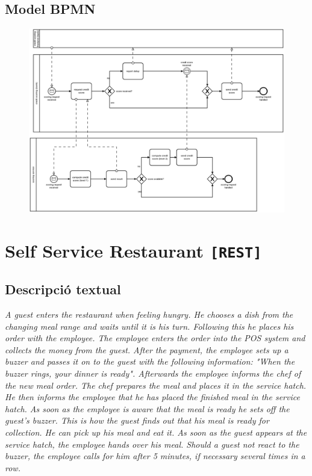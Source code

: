 \subsection*{Model BPMN}

\begin{figure}[!h]
    \centering
    \includegraphics[width=\textwidth]{figures/benchmark/Credit-scoring.png}
\end{figure}

\clearpage

\section{Self Service Restaurant \texttt{[REST]}}

\subsection*{Descripció textual}

\textit{A guest enters the restaurant when feeling hungry. He chooses a dish from the changing meal range and waits until it is his turn. Following this he places his order with the employee. The employee enters the order into the POS system and collects the money from the guest. After the payment, the employee sets up a buzzer and passes it on to the guest with the following information: "When the buzzer rings, your dinner is ready". Afterwards the employee informs the chef of the new meal order. The chef prepares the meal and places it in the service hatch. He then informs the employee that he has placed the finished meal in the service hatch. As soon as the employee is aware that the meal is ready he sets off the guest's buzzer. This is how the guest finds out that his meal is ready for collection. He can pick up his meal and eat it. As soon as the guest appears at the service hatch, the employee hands over his meal. Should a guest not react to the buzzer, the employee calls for him after 5 minutes, if necessary several times in a row.}

